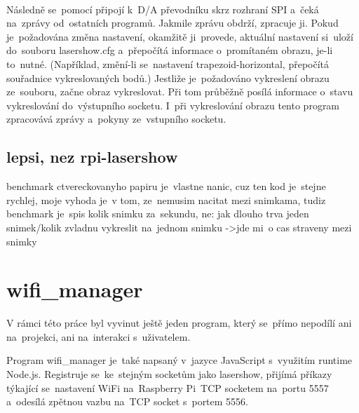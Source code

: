 \





Následně se~pomocí připojí k~D/A převodníku skrz rozhraní SPI\cite{wiki-SPI} a~čeká na~zprávy od~ostatních programů. Jakmile zprávu obdrží, zpracuje ji.
Pokud je~požadována změna nastavení, okamžitě ji~provede, aktuální nastavení si~uloží do~souboru lasershow.cfg a~přepočítá informace o~promítaném obrazu, je-li to~nutné.
(Například, změní-li se~nastavení trapezoid-horizontal, přepočítá souřadnice vykreslovaných bodů.) Jestliže je~požadováno vykreslení obrazu ze~souboru, začne obraz vykreslovat.
Při tom průběžně posílá informace o~stavu vykreslování do~výstupního socketu. I~při vykreslování obrazu tento program zpracovává zprávy a~pokyny ze~vstupního socketu.



\subsection{lepsi, nez rpi-lasershow}
benchmark ctvereckovanyho papiru je~vlastne nanic, cuz ten kod je~stejne rychlej, moje vyhoda je~v tom, ze~nemusim nacitat mezi snimkama, tudiz benchmark je~spis kolik snimku za~sekundu, ne: jak dlouho trva jeden snimek/kolik zvladnu vykreslit na~jednom snimku
->jde mi~o cas straveny mezi snimky

\section{wifi\_manager}

V rámci této práce byl vyvinut ještě jeden program, který se~přímo nepodílí ani na~projekci, ani na~interakci s~uživatelem.

Program wifi\_manager je~také napsaný v~jazyce JavaScript s~využitím runtime Node.js. Registruje se~ke~stejným socketům jako lasershow, přijímá příkazy týkající se~nastavení WiFi na~Raspberry Pi~TCP socketem na~portu 5557 a~odesílá zpětnou vazbu na~TCP socket s~portem 5556.

